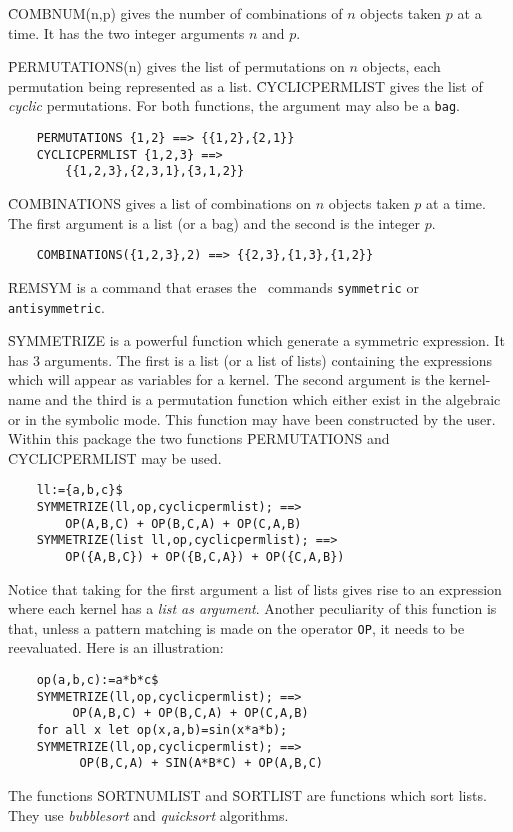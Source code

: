 \begin{itemize}
\f{COMBNUM(n,p)} gives the number of combinations of
$n$ objects taken $p$ at a time. It has the two integer arguments $n$
and $p$.

\f{PERMUTATIONS(n)} gives the list of permutations
on $n$ objects, each permutation being represented as a list.
\f{CYCLICPERMLIST} gives the list of
{\em cyclic} permutations.  For both functions, the argument may
also be a {\tt bag}.
\begin{verbatim}
	PERMUTATIONS {1,2} ==> {{1,2},{2,1}}
	CYCLICPERMLIST {1,2,3} ==>
		{{1,2,3},{2,3,1},{3,1,2}}
\end{verbatim}
\f{COMBINATIONS} gives a list of combinations on
$n$ objects taken $p$ at a time. The first argument is a
list (or a bag) and the second is the integer $p$.
\begin{verbatim}
	COMBINATIONS({1,2,3},2) ==> {{2,3},{1,3},{1,2}}
\end{verbatim}
\f{REMSYM} is a command that erases the \REDUCE\ commands
{\tt symmetric} or {\tt antisymmetric}.

\f{SYMMETRIZE} is a powerful function which
generate a symmetric expression.
It has 3 arguments. The first is a list (or a list of lists) containing
the expressions which will appear as variables for a kernel. The second
argument is the kernel-name and the third is a permutation function
which either exist in the algebraic or in the symbolic mode.  This
function may have been constructed by the user.  Within this package
the two functions \f{PERMUTATIONS} and \f{CYCLICPERMLIST} may be used.
\begin{verbatim}
	ll:={a,b,c}$
	SYMMETRIZE(ll,op,cyclicpermlist); ==>
		OP(A,B,C) + OP(B,C,A) + OP(C,A,B)
	SYMMETRIZE(list ll,op,cyclicpermlist); ==>
		OP({A,B,C}) + OP({B,C,A}) + OP({C,A,B})
\end{verbatim}
Notice that taking for the first argument a list of lists gives rise to
an expression where  each kernel has a {\em list as argument}.  Another
peculiarity of this function is that, unless a pattern matching is
made on the operator \verb+OP+, it needs to be reevaluated.  Here is
an illustration:
\begin{verbatim}
	op(a,b,c):=a*b*c$
	SYMMETRIZE(ll,op,cyclicpermlist); ==>
		 OP(A,B,C) + OP(B,C,A) + OP(C,A,B)
	for all x let op(x,a,b)=sin(x*a*b);
	SYMMETRIZE(ll,op,cyclicpermlist); ==>
		  OP(B,C,A) + SIN(A*B*C) + OP(A,B,C)
\end{verbatim}
The functions \f{SORTNUMLIST} and
\f{SORTLIST} are functions which sort
lists.  They use {\em bubblesort} and {\em quicksort} algorithms.


\end{itemize}
